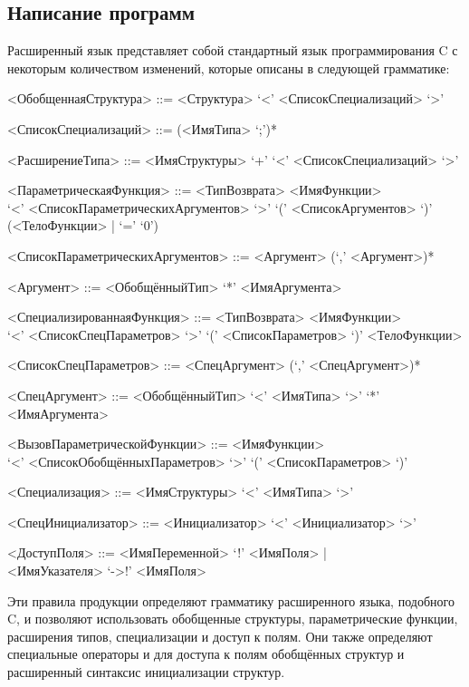 \subsection{Написание программ}
\label{sec:howtowrite}
Расширенный язык представляет собой стандартный язык программирования C с некоторым количеством изменений, которые описаны в следующей грамматике:

\begin{grammar}
  <ОбобщеннаяСтруктура> ::= <Структура> `<' <СписокСпециализаций> `>'

  <СписокСпециализаций> ::= (<ИмяТипа> `;')*
\end{grammar}

\begin{grammar}
  <РасширениеТипа> ::= <ИмяСтруктуры> `+' `<' <СписокСпециализаций> `>'
\end{grammar}

\begin{grammar}
  <ПараметрическаяФункция> ::= <ТипВозврата> <ИмяФункции> \\
  `<' <СписокПараметрическихАргументов> `>' `(' <СписокАргументов> `)' \\
  (<ТелоФункции> | `=' `0')

  <СписокПараметрическихАргументов> ::= <Аргумент> (`,' <Аргумент>)*

  <Аргумент> ::= <ОбобщённыйТип> `*' <ИмяАргумента>
\end{grammar}

\begin{grammar}
  <СпециализированнаяФункция> ::= <ТипВозврата> <ИмяФункции> \\
  `<' <СписокСпецПараметров> `>' `(' <СписокПараметров> `)'
  <ТелоФункции>

  <СписокСпецПараметров> ::= <СпецАргумент> (`,' <СпецАргумент>)*

  <СпецАргумент> ::= <ОбобщённыйТип> `<' <ИмяТипа> `>' `*' <ИмяАргумента>
\end{grammar}

\begin{grammar}
  <ВызовПараметрическойФункции> ::= <ИмяФункции> \\
  `<' <СписокОбобщённыхПараметров> `>' `(' <СписокПараметров> `)'
\end{grammar}

\begin{grammar}
  <Специализация> ::= <ИмяСтруктуры> `<' <ИмяТипа> `>'

  <СпецИнициализатор> ::= <Инициализатор> `<' <Инициализатор> `>'
\end{grammar}

\begin{grammar}
  <ДоступПоля> ::= <ИмяПеременной> `!' <ИмяПоля> | \\
  <ИмяУказателя> `->!' <ИмяПоля>
\end{grammar}

Эти правила продукции определяют грамматику расширенного языка, подобного C, и позволяют использовать обобщенные структуры, параметрические функции, расширения типов, специализации и доступ к полям.
Они также определяют специальные операторы \cmd{->!} и \cmd{!} для доступа к полям обобщённых структур и расширенный синтаксис инициализации структур.
